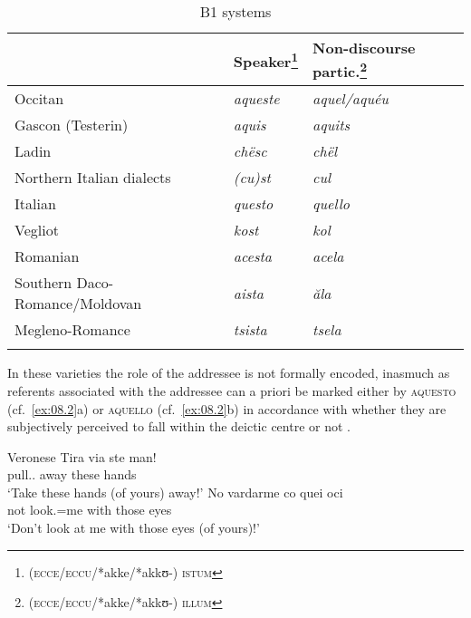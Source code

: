 \documentclass[output=paper]{langsci/langscibook}
\begin{document}
\begin{table}
    \caption{B1 systems}\label{tab:08.1}
        \begin{tabular}{lll}
\lsptoprule
   & Speaker\footnote{(\textsc{ecce}/\textsc{eccu}/*akke/*akkʊ-) \textsc{istum}}   & Non-discourse partic.\footnote{(\textsc{ecce}/\textsc{eccu}/*akke/*akkʊ-) \textsc{illum}} \\\midrule
Occitan                           & \emph{aqueste}                                            & \emph{aquel/aquéu}\\
Gascon (Testerin)                       & \emph{aquis}                                              & \emph{aquits}\\
Ladin                             & \emph{chësc}                                              & \emph{chël}\\
Northern Italian dialects         & \emph{(cu)st}                                             & \emph{cul}\\
Italian                           & \emph{questo}                                             & \emph{quello}\\
Vegliot                                 & \emph{kost}                                               & \emph{kol}\\
Romanian                          & \emph{acesta}                                             & \emph{acela}\\
Southern Daco-Romance\slash Moldovan & \emph{aista}                                              & \emph{ăla}\\
Megleno-Romance                         & \emph{tsista}                                             & \emph{tsela}\\
\lspbottomrule
        \end{tabular}  
\end{table}

In these varieties the role of the addressee is not formally encoded, inasmuch
as referents associated with the addressee can a priori be marked either by
\textsc{aquesto} (cf.\ \ref{ex:08.2}a) or \textsc{aquello} (cf.\
\ref{ex:08.2}b) in accordance with whether they are subjectively
perceived to fall within the deictic centre or not
\citep[71--77]{Irsara:2009a}.

\ea Veronese\label{ex:08.2}
\ea
\gll   Tira  via  ste  man!\\
pull.\Imp{}.\Ssg{}  away  these  hands\\
\glt \enquote*{Take these hands (of yours) away!}
\ex
\gll   No  vardarme  co  quei  oci\\
not  look.\Inf{}=me  with  those  eyes\\
\glt \enquote*{Don’t look at me with those eyes (of yours)!}
\z
\z
\end{document}
